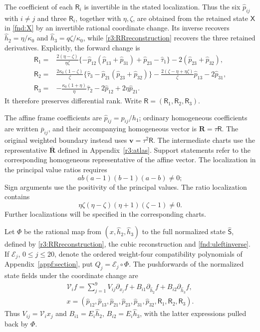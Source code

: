 \documentclass[11pt,a4paper]{article}
\numberwithin{equation}{section}
\theoremstyle{plain}
\theoremstyle{definition}
\theoremstyle{remark}
\begin{document}
The coefficient of each $\mathsf R_i$ is invertible in the stated localization.
Thus the six $\widehat p_{ij}$ with $i\ne j$ and three $\mathsf R_i$, together with
$\eta,\zeta$, are obtained from the retained state $\mathsf X$ in \eqref{fnd:X} by an
invertible rational coordinate change. Its inverse recovers
$\widehat h_2=\eta/\kappa_0$ and
$\widehat h_3=q\zeta/\kappa_0$, while \eqref{r3:RRreconstruction}
recovers the three retained derivatives. Explicitly, the forward change is
\[
\begin{aligned}
 \mathsf R_1={}&\frac{2(\eta-\zeta)}{\eta\zeta}
  \{-\widehat p_{12}(\widehat p_{13}+\widehat p_{31})
       +\widehat p_{23}-\widehat\tau_1\}
       -2(\widehat p_{23}+\widehat p_{32}),\\
 \mathsf R_2={}&\frac{2\kappa_0(1-\zeta)}{\zeta}
  \{\widehat\tau_3-\widehat p_{21}(\widehat p_{23}+\widehat p_{32})\}
  -\frac{2(\zeta-\eta+\eta\zeta)}{\zeta}\widehat p_{13}
  -2\widehat p_{31},\\
 \mathsf R_3={}&-\frac{\kappa_0(1+\eta)}{\eta}\widehat\tau_2
                  -2\widehat p_{12}+2\eta\widehat p_{21}.
\end{aligned}
\]
It therefore preserves differential rank. Write
$\mathsf R=(\mathsf R_1,\mathsf R_2,\mathsf R_3)$.

The affine frame coefficients are $\widehat p_{ij}=p_{ij}/h_1$;
ordinary homogeneous coefficients are written $\overline p_{ij}$,
and their accompanying homogeneous vector is $\boldsymbol R=\tau\mathsf R$.
The original weighted boundary instead uses $\boldsymbol v=\tau^2\mathsf R$.
The intermediate charts use the representative $\overline{\boldsymbol R}$
defined in Appendix~\ref{r3:atlas}. Support statements refer to the
corresponding homogeneous representative of the affine vector.
The localization in the principal value ratios requires
\[
 a b(a-1)(b-1)(a-b)\ne0;
\]
Sign arguments use the positivity of the principal values.
The ratio localization contains
\[
 \eta \zeta (\eta -\zeta )(\eta +1)(\zeta -1)\ne0.
\]
Further localizations will be specified in the corresponding charts.

Let $\Phi$ be the rational map from $(x,\widehat h_2,\widehat h_3)$
to the full normalized state $\widehat{\mathsf S}$, defined by
\eqref{r3:RRreconstruction}, the cubic reconstruction and
\eqref{fnd:uleftinverse}. If $\mathcal E_j$, $0\le j\le20$,
denote the ordered weight-four compatibility polynomials of
Appendix~\ref{appf:section}, put $Q_j=\mathcal E_j\circ\Phi$.
The pushforwards of the normalized state fields under the coordinate
change are
\begin{equation}\label{appr3:jointderivation}
\begin{aligned}
 \mathcal V_i f
 =\sum_{j=1}^{9}V_{ij}\partial_{x_j}f
   +B_{i1}\partial_{\widehat h_2}f+B_{i2}\partial_{\widehat h_3}f,\\
 x=(\widehat p_{12},\widehat p_{13},\widehat p_{21},\widehat p_{23},\widehat p_{31},\widehat p_{32},\mathsf R_1,\mathsf R_2,\mathsf R_3).
\end{aligned}
\end{equation}
Thus $V_{ij}=\mathcal V_i x_j$ and
$B_{i1}=E_i\widehat h_2$, $B_{i2}=E_i\widehat h_3$, with the latter
expressions pulled back by $\Phi$.
\end{document}
